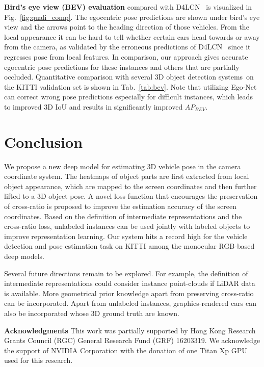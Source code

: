 \documentclass[final]{cvpr}
\begin{document}
\noindent \textbf{Bird's eye view (BEV) evaluation} compared with D4LCN~\cite{Ding_2020_CVPR} is visualized in Fig.~\ref{fig:quali_comp}. The egocentric pose predictions are shown under bird's eye view and the arrows point to the heading direction of those vehicles. From the local appearance it can be hard to tell whether certain cars head towards or away from the camera, as validated by the erroneous predictions of D4LCN~\cite{Ding_2020_CVPR} since it regresses pose from local features. In comparison, our approach gives accurate egocentric pose predictions for these instances and others that are partially occluded. Quantitative comparison with several 3D object detection systems~on the KITTI validation set is shown in Tab.~\ref{tab:bev}. Note that utilizing Ego-Net can correct wrong pose predictions especially for difficult instances, which leads to improved 3D IoU and results in significantly improved $AP_{BEV}$.
	
\section{Conclusion} 
We propose a new deep model for estimating 3D vehicle pose in the camera coordinate system. The heatmaps of object parts are first extracted from local object appearance, which are mapped to the screen coordinates and then further lifted to a 3D object pose. A novel loss function that encourages the preservation of cross-ratio is proposed to improve the estimation accuracy of the screen coordinates. Based on the definition of intermediate representations and the cross-ratio loss, unlabeled instances can be used jointly with labeled objects to improve representation learning. Our system hits a record high for the vehicle detection and pose estimation task on KITTI among the monocular RGB-based deep models. 

Several future directions remain to be explored. For example, the definition of intermediate representations could consider instance point-clouds if LiDAR data is available. More geometrical prior knowledge apart from preserving cross-ratio can be incorporated. Apart from unlabeled instances, graphics-rendered cars can also be incorporated whose 3D ground truth are known.

\noindent \textbf{Acknowledgments} This work was partially supported by Hong Kong Research Grants Council (RGC) General Research Fund (GRF) 16203319. We acknowledge the support
of NVIDIA Corporation with the donation of one Titan Xp GPU used for this research.
\end{document}
